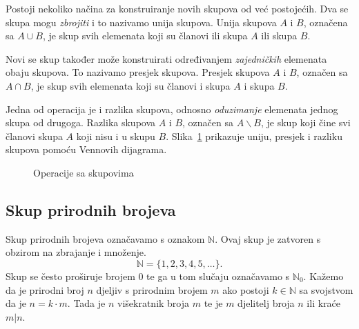 Postoji nekoliko načina za konstruiranje novih skupova od već postojećih.
Dva se skupa mogu \emph{zbrojiti} i to nazivamo unija skupova.
Unija skupova $A$ i $B$, označena sa $A \cup B$, je skup svih elemenata koji su članovi ili skupa $A$ ili skupa $B$.

Novi se skup također može konstruirati određivanjem \emph{zajedničkih} elemenata obaju skupova.
To nazivamo presjek skupova.
Presjek skupova $A$ i $B$, označen sa $A \cap B$, je skup svih elemenata koji su članovi i skupa $A$ i skupa $B$.

Jedna od operacija je i razlika skupova, odnosno \emph{oduzimanje} elemenata jednog skupa od drugoga.
Razlika skupova $A$ i $B$, označen sa $A \backslash B$, je skup koji čine svi članovi skupa $A$ koji nisu i u skupu $B$.
Slika~\ref{fig:operacije-sa-skupovima} prikazuje uniju, presjek i razliku skupova pomoću Vennovih dijagrama.

\begin{figure}[ht]
\begin{center}\vspace{0.25cm}
\end{center}
\caption{Operacije sa skupovima}\label{fig:operacije-sa-skupovima}
\end{figure}

\subsection{Skup prirodnih brojeva}\label{subsec:skup-prirodnih-brojeva}
Skup prirodnih brojeva označavamo s oznakom $\mathbb{N}$.
Ovaj skup je zatvoren s obzirom na zbrajanje i množenje.
\[ \mathbb{N}=\{1,2,3,4,5,\ldots\}. \]
Skup se često proširuje brojem 0 te ga u tom slučaju označavamo s $\mathbb{N}_0$.
Kažemo da je prirodni broj $n$ djeljiv s prirodnim brojem $m$ ako postoji $k \in \mathbb{N}$ sa svojstvom da je $n=k \cdot m$.
Tada je $n$ višekratnik broja $m$ te je $m$ djelitelj broja $n$ ili kraće $m|n$.

